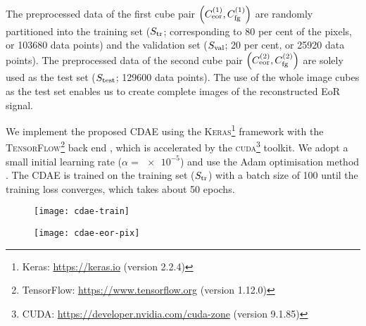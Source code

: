 The preprocessed data of the first cube pair
$\left( C_{\mathrm{eor}}^{(1)}, C_{\mathrm{fg}}^{(1)} \right)$
are randomly partitioned into the training set ($S_{\mathrm{tr}}$; corresponding
to 80 per cent of the pixels, or \num{103680} data points) and the
validation set ($S_{\mathrm{val}}$; 20 per cent, or \num{25920} data points).
The preprocessed data of the second cube pair
$\left( C_{\mathrm{eor}}^{(2)}, C_{\mathrm{fg}}^{(2)} \right)$
are solely used as the test set ($S_{\mathrm{test}}$; \num{129600} data points).
The use of the whole image cubes as the test set enables us to create
complete images of the reconstructed EoR signal.

We implement the proposed CDAE using the
\textsc{Keras}\footnote{Keras: \url{https://keras.io}
  (version 2.2.4)}
framework \cite{keras} with the
\textsc{TensorFlow}\footnote{TensorFlow:
  \url{https://www.tensorflow.org} (version 1.12.0)}
back end \cite{tensorflow},
which is accelerated by the \textsc{cuda}\footnote{\raggedright%
  CUDA: \url{https://developer.nvidia.com/cuda-zone} (version 9.1.85)}
toolkit.
We adopt a small initial learning rate ($\alpha = \num{e-5}$) and use the
Adam optimisation method \cite{kingma2015}.
The CDAE is trained on the training set ($S_{\mathrm{tr}}$) with a batch size of
100 until the training loss converges, which takes about 50 epochs.

\begin{figure}[htp]
  \centering
  \texttt{[image: cdae-train]}
  \label{fig:cdae-train}
\end{figure}

\begin{figure}[htp]
  \centering
  \texttt{[image: cdae-eor-pix]}
  \label{fig:cdae-eor-pix}
\end{figure}

